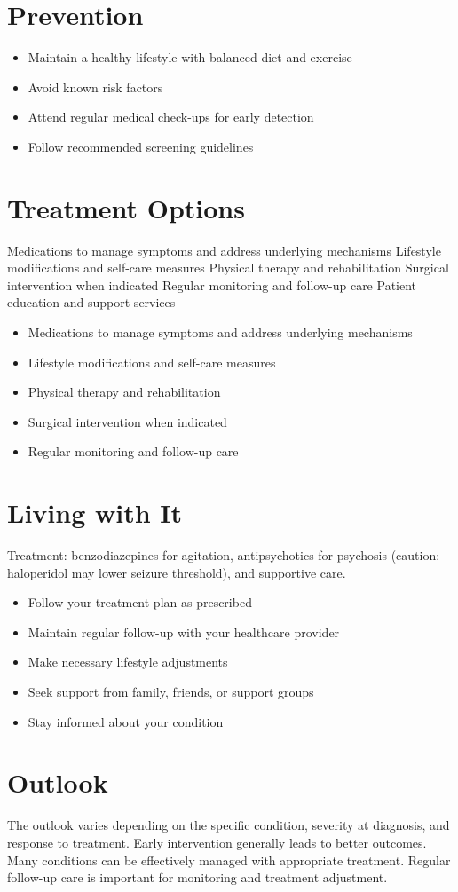 \section{Prevention}
\begin{itemize}[noitemsep]
  \item Maintain a healthy lifestyle with balanced diet and exercise
  \item Avoid known risk factors
  \item Attend regular medical check-ups for early detection
  \item Follow recommended screening guidelines
\end{itemize}
\section{Treatment Options}
Medications to manage symptoms and address underlying mechanisms Lifestyle modifications and self-care measures Physical therapy and rehabilitation Surgical intervention when indicated Regular monitoring and follow-up care Patient education and support services

\begin{itemize}[noitemsep]
  \item Medications to manage symptoms and address underlying mechanisms
  \item Lifestyle modifications and self-care measures
  \item Physical therapy and rehabilitation
  \item Surgical intervention when indicated
  \item Regular monitoring and follow-up care
\end{itemize}
\section{Living with It}
Treatment: benzodiazepines for agitation, antipsychotics for psychosis (caution: haloperidol may lower seizure threshold), and supportive care.

\begin{itemize}[noitemsep]
  \item Follow your treatment plan as prescribed
  \item Maintain regular follow-up with your healthcare provider
  \item Make necessary lifestyle adjustments
  \item Seek support from family, friends, or support groups
  \item Stay informed about your condition
\end{itemize}
\section{Outlook}
The outlook varies depending on the specific condition, severity at diagnosis, and response to treatment. Early intervention generally leads to better outcomes. Many conditions can be effectively managed with appropriate treatment. Regular follow-up care is important for monitoring and treatment adjustment.
